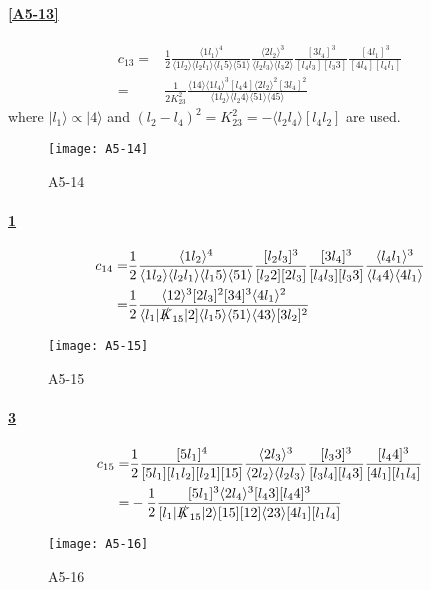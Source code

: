 \paragraph{\ref{A5-13}}
\begin{equation*}
\begin{split}
c_{13} = &
\frac{1}{2}\frac{\langle 1 l_1 \rangle^4}{\langle 1 l_2 \rangle\langle l_2 l_1 \rangle\langle l_1 5 \rangle\langle 51 \rangle}
\frac{\langle 2l_2\rangle^3}{\langle l_2 l_3\rangle\langle l_3 2 \rangle}
\frac{[3l_4]^3}{[l_4 l_3][l_3 3]}
\frac{[4l_1]^3}{[4l_4][l_4l_1]}
\\
= &
\frac{1}{2K_{23}^2}\frac{\langle 14\rangle\langle 1 l_4\rangle^3[l_4 4]\langle 2l_2\rangle^2[3l_4]^2}{\langle 1l_2\rangle\langle l_2 4\rangle\langle 51\rangle\langle 45\rangle}
\end{split}
\end{equation*}
where $|l_1\rangle \propto |4\rangle$ and $(l_2 - l_4)^2 = K_{23}^2 = -\langle l_2 l_4\rangle[l_4l_2]$ are used.
%
%
\begin{figure}
  \centering
    \texttt{[image: A5-14]}
    \caption{A5-14}
  \label{A5-14}
\end{figure}
\paragraph{\ref{A5-14}}
\begin{equation*}
\begin{split}
c_{14} = & \frac{1}{2}\frac{\langle 1l_2\rangle^4}{\langle 1 l_2 \rangle\langle l_2 l_1 \rangle\langle l_1 5\rangle\langle 5 1\rangle}
\frac{[l_2 l_3]^3}{[l_2 2 ][2 l_3]}
\frac{[3l_4]^3}{[l_4 l_3][l_3 3]}
\frac{\langle l_4 l_1 \rangle^3}{\langle l_4 4 \rangle\langle 4 l_1\rangle}
\\
= &
\frac{1}{2}
\frac{\langle 12 \rangle^3[2l_3]^2[34]^3\langle 4 l_1 \rangle^2}{\langle l_1 |\slashed{K}_{15}|2]\langle l_1 5\rangle\langle 51 \rangle\langle 43\rangle[3l_2]^2}
\end{split}
\end{equation*}
%
%
\begin{figure}
  \centering
    \texttt{[image: A5-15]}
    \caption{A5-15}
  \label{A5-15}
\end{figure}
\paragraph{\ref{A5-15}}
\begin{equation*}
\begin{split}
c_{15} = &
\frac{1}{2}
\frac{[5l_1]^4}{[5l_1][l_1  l_2][l_2 1][15]}
\frac{\langle 2 l_3\rangle^3}{\langle 2 l_2 \rangle\langle l_2 l_3\rangle}
\frac{[l_3 3 ]^3}{[l_3 l_4][l_4 3]}
\frac{[l_4 4]^3}{[4l_1][l_1 l_4]}
\\
= &
-\frac{1}{2}
\frac{[5l_1]^3\langle 2l_4\rangle^3[l_4 3][l_4 4]^3}{[l_1|\slashed{K}_{15}|2\rangle [15][12]\langle 23\rangle[4l_1][l_1l_4]}
\end{split}
\end{equation*}
%
%
\begin{figure}
  \centering
    \texttt{[image: A5-16]}
    \caption{A5-16}
  \label{A5-15}
\end{figure}
